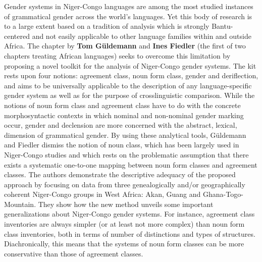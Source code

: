 \documentclass[output=collectionpaper]{langsci/langscibook}
\begin{document}
Gender systems in Niger-Congo languages are among the most studied instances of grammatical gender across the world’s languages. Yet this body of research is to a large extent based on a tradition of analysis which is strongly Bantu-centered and not easily applicable to other language families within and outside Africa. The chapter by \textbf{Tom Güldemann} and \textbf{Ines Fiedler} (the first of two chapters treating African languages) seeks to overcome this limitation by proposing a novel toolkit for the analysis of Niger-Congo gender systems. The kit rests upon four notions: agreement class, noun form class, gender and deriflection, and aims to be universally applicable to the description of any language-specific gender system as well as for the purpose of crosslinguistic comparison. While the notions of noun form class and agreement class have to do with the concrete morphosyntactic contexts in which nominal and non-nominal gender marking occur, gender and declension are more concerned with the abstract, lexical, dimension of grammatical gender. By using these analytical tools, Güldemann and Fiedler dismiss the notion of noun class, which has been largely used in Niger-Congo studies and which rests on the problematic assumption that there exists a systematic one-to-one mapping between noun form classes and agreement classes. The authors demonstrate the descriptive adequacy of the proposed approach by focusing on data from three genealogically and/or geographically coherent Niger-Congo groups in West Africa: Akan, Guang and Ghana-Togo-Mountain. They show how the new method unveils some important generalizations about Niger-Congo gender systems. For instance, agreement class inventories are always simpler (or at least not more complex) than noun form class inventories, both in terms of number of distinctions and types of structures. Diachronically, this means that the systems of noun form classes can be more conservative than those of agreement classes.
\end{document}
